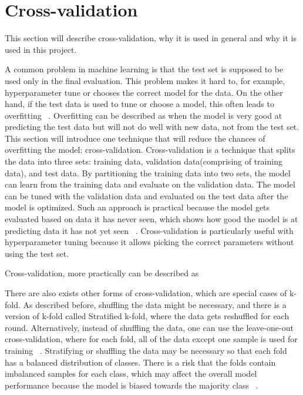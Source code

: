 \section{Cross-validation}\label{sec:cross-validation}

This section will describe cross-validation, why it is used in general and why it is used in this project.

A common problem in machine learning is that the test set is supposed to be used only in the final evaluation. This problem makes it hard to, for example, hyperparameter tune or chooses the correct model for the data. On the other hand, if the test data is used to tune or choose a model, this often leads to overfitting ~\cite{james-statistical-learning}.
Overfitting can be described as when the model is very good at predicting the test data but will not do well with new data, not from the test set. This section will introduce one technique that will reduce the chances of overfitting the model: cross-validation. Cross-validation is a technique that splits the data into three sets: training data, validation data(comprising of training data), and test data. By partitioning the training data into two sets, the model can learn from the training data and evaluate on the validation data. The model can be tuned with the validation data and evaluated on the test data after the model is optimized. Such an approach is practical because the model gets evaluated based on data it has never seen, which shows how good the model is at predicting data it has not yet seen ~\cite{scikit-learn-ml}. Cross-validation is particularly useful with hyperparameter tuning because it allows picking the correct parameters without using the test set.


Cross-validation, more practically can be described as

There are also exists other forms of cross-validation, which are special cases of k-fold. As described before, shuffling the data might be necessary, and there is a version of k-fold called Stratified k-fold, where the data gets reshuffled for each round. Alternatively, instead of shuffling the data, one can use the leave-one-out cross-validation, where for each fold, all of the data except one sample is used for training ~\cite{Refaeilzadeh2009}. Stratifying or shuffling the data may be necessary so that each fold has a balanced distribution of classes. There is a risk that the folds contain imbalanced samples for each class, which may affect the overall model performance because the model is biased towards the majority class ~\cite{Refaeilzadeh2009}.

